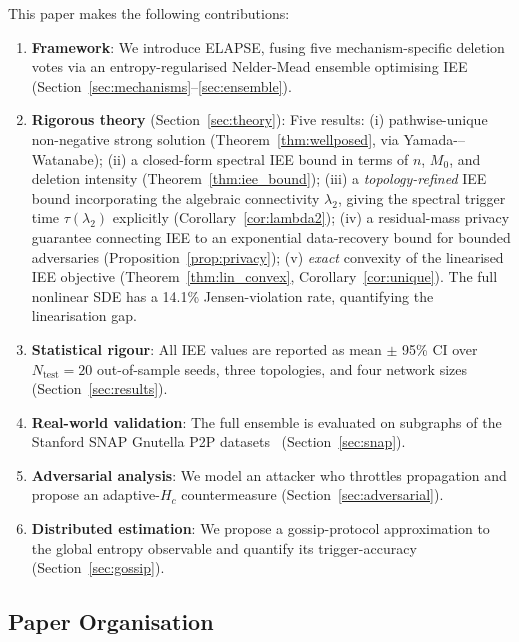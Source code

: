 \documentclass[review,12pt]{elsarticle}
\newcommand{\Hc}{H_c}
\begin{document}
This paper makes the following contributions:
\begin{enumerate}
  \item \textbf{Framework}: We introduce ELAPSE, fusing five mechanism-specific
        deletion votes via an entropy-regularised Nelder-Mead ensemble optimising
        IEE (Section~\ref{sec:mechanisms}--\ref{sec:ensemble}).
  \item \textbf{Rigorous theory} (Section~\ref{sec:theory}):
        Five results: (i) pathwise-unique non-negative strong solution
        (Theorem~\ref{thm:wellposed}, via Yamada-–Watanabe);
        (ii) a closed-form spectral IEE bound in terms of $n$, $M_0$,
        and deletion intensity (Theorem~\ref{thm:iee_bound});
        (iii) a \emph{topology-refined} IEE bound incorporating the
        algebraic connectivity $\lambda_2$, giving the spectral trigger
        time $\tau(\lambda_2)$ explicitly (Corollary~\ref{cor:lambda2});
        (iv) a residual-mass privacy guarantee connecting IEE to an
        exponential data-recovery bound for bounded adversaries
        (Proposition~\ref{prop:privacy});
        (v) \emph{exact} convexity of the linearised IEE objective
        (Theorem~\ref{thm:lin_convex}, Corollary~\ref{cor:unique}).
        The full nonlinear SDE has a 14.1\% Jensen-violation rate,
        quantifying the linearisation gap.
  \item \textbf{Statistical rigour}: All IEE values are reported as
        mean $\pm$ 95\% CI over $N_{\mathrm{test}} = 20$ out-of-sample seeds,
        three topologies, and four network sizes (Section~\ref{sec:results}).
  \item \textbf{Real-world validation}: The full ensemble is evaluated on
        subgraphs of the Stanford SNAP Gnutella P2P
        datasets~\cite{snapnets} (Section~\ref{sec:snap}).
  \item \textbf{Adversarial analysis}: We model an attacker who throttles
        propagation and propose an adaptive-$\Hc$ countermeasure
        (Section~\ref{sec:adversarial}).
  \item \textbf{Distributed estimation}: We propose a gossip-protocol
        approximation to the global entropy observable and quantify its
        trigger-accuracy (Section~\ref{sec:gossip}).
\end{enumerate}

\subsection{Paper Organisation}
\end{document}
